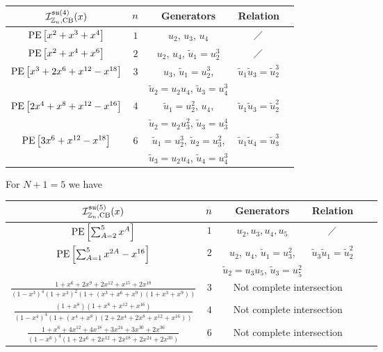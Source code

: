 \documentclass[main.tex]{subfiles}
\begin{document}
\begin{center}
\begin{tabular}{|c|c|c|c|c|}
\hline
$\mathcal{I}_{\mathbb{Z}_{n},\text{CB}}^{\mathfrak{su}(4)}(x)$&${n}$&Generators&Relation\\\hline
$\operatorname{\mathrm{PE}}\left[x^2+x^3+x^4\right]$ & $1$ &$u_2$, $u_3$, $u_4$&$\diagup$\\\hline
$\operatorname{\mathrm{PE}}\left[x^2+x^4+x^6\right]$ & $2$ & $u_2$, $u_4$, $\widetilde{u}_1=u_2^3$&$\diagup$\\\hline
\multirow{ 2}{*}{$\operatorname{\mathrm{PE}}\left[x^3+2x^6+x^{12}-x^{18}\right]$} & \multirow{ 2}{*}{$3$} & $u_3$, $\widetilde{u}_1=u_2^3$,&\multirow{ 2}{*}{$\widetilde{u}_1\widetilde{u}_3=\widetilde{u}_2^3$}\\
&&$\widetilde{u}_2=u_2u_4$, $\widetilde{u}_3=u_4^3$&\\\hline
\multirow{ 2}{*}{$\operatorname{\mathrm{PE}}\left[2x^4+x^8+x^{12}-x^{16}\right]$} & \multirow{ 2}{*}{$4$} & $\widetilde{u}_1=u_2^2$, $u_4$,&\multirow{ 2}{*}{$\widetilde{u}_1\widetilde{u}_3=\widetilde{u}_2^2$}\\
&&$\widetilde{u}_2=u_2u_3^2$, $\widetilde{u}_3=u_3^4$&\\\hline
\multirow{ 2}{*}{$\operatorname{\mathrm{PE}}\left[3x^6+x^{12}-x^{18}\right]$} & \multirow{ 2}{*}{$6$} & $\widetilde{u}_1=u_2^3$, $\widetilde{u}_2=u_3^2$,&\multirow{ 2}{*}{$\widetilde{u}_1\widetilde{u}_4=\widetilde{u}_3^3$}\\
&&$\widetilde{u}_3=u_2u_4$, $\widetilde{u}_4=u_4^3$&\\\hline
\end{tabular}
\end{center}
\vspace{0.1cm}
For $N+1=5$ we have
\vspace{0.1cm}
\begin{center}
\begin{tabular}{|c|c|c|c|c|c|}
\hline
$\mathcal{I}_{\mathbb{Z}_{n},\text{CB}}^{\mathfrak{su}(5)}(x)$&${n}$&Generators&Relation\\\hline
$\operatorname{\mathrm{PE}}\left[\sum_{A=2}^5x^A\right]$ & $1$ &$u_2,u_3,u_4,u_5$&$\diagup$\\\hline
\multirow{ 2}{*}{$\operatorname{\mathrm{PE}}\left[\sum_{A=1}^5x^{2A}-x^{16}\right]$} & \multirow{ 2}{*}{$2$} & $u_2$, $u_4$, $\widetilde{u}_1=u_3^2$,&\multirow{ 2}{*}{$\widetilde{u}_3\widetilde{u}_1=\widetilde{u}_2^2$}\\
&&$\widetilde{u}_2=u_3u_5$, $\widetilde{u}_3=u_5^2$&\\\hline
$\frac{1+x^6+2x^9+2x^{12}+x^{15}+2x^{18}}{(1-x^3)^4(1+x^3)^2(1+(x^3+x^6+x^9)(1+x^3+x^9))}$ & $3$&\multicolumn{2}{c|}{Not complete intersection}\\\hline
$\frac{(1+x^8)(1+x^8+x^{12}+x^{16})}{(1-x^4)^4(1+(x^4+x^8)(2+2x^4+2x^8+x^{12}+x^{16}))}$ & $4$&\multicolumn{2}{c|}{Not complete intersection}\\\hline
$\frac{1+x^6+4x^{12}+4x^{18}+3x^{24}+3x^{30}+2x^{36}}{(1-x^6)^4(1+2x^6+2x^{12}+2x^{18}+2x^{24}+2x^{30})}$ & $6$&\multicolumn{2}{c|}{Not complete intersection}\\\hline
\end{tabular}
\end{center}
\end{document}

